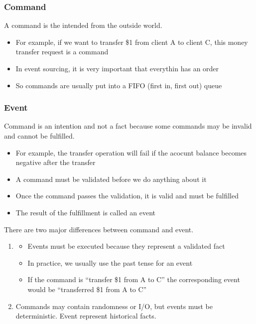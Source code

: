 \documentclass{report}
\theoremstyle{definition}
\let\oldsubsubsection\subsubsection
\renewcommand{\subsubsection}{\oldsubsubsection*}
\begin{document}
\subsubsection{Command}

A command is the intended from the outside world.

\begin{itemize}
\item
For example, if we want to transfer \$1 from client A to client C, this money transfer request is a command
\item
In event sourcing, it is very important that everythin has an order
\item
So commands are usually put into a FIFO (first in, first out) queue
\end{itemize}

\subsubsection{Event}

Command is an intention and not a fact because some commands may be invalid and cannot be fulfilled.

\begin{itemize}
\item
For example, the transfer operation will fail if the acocunt balance becomes negative after the transfer
\item
A command must be validated before we do anything about it
\item
Once the command passes the validation, it is valid and must be fulfilled
\item
The result of the fulfillment is called an event
\end{itemize}

There are two major differences between command and event.

\begin{enumerate}
\item

\begin{itemize}
\item
Events must be executed because they represent a validated fact
\item
In practice, we usually use the past tense for an event
\item
If the command is ``transfer \$1 from A to C'' the corresponding event would be ``transferred \$1 from A to C''
\end{itemize}
\item
Commands may contain randomness or I/O, but events must be deterministic. Event represent historical facts.
\end{enumerate}
\end{document}
